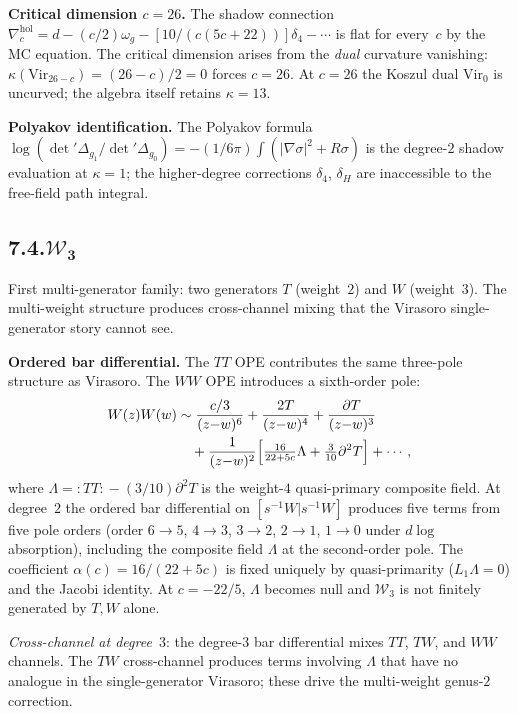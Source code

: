 \documentclass[11pt,reqno]{amsart}
\theoremstyle{definition}
\theoremstyle{remark}
\providecommand{\cW}{\mathcal{W}}
\providecommand{\Vir}{\mathrm{Vir}}
\providecommand{\hol}{\mathrm{hol}}
\numberwithin{equation}{section}
\begin{document}
\medskip\noindent\textbf{Critical dimension $c=26$.}\enspace
The shadow connection
$\nabla^{\hol}_c=d-(c/2)\omega_g
-[10/(c(5c+22))]\delta_4-\cdots$
is flat for every~$c$ by the MC equation. The critical dimension
arises from the \emph{dual} curvature vanishing:
$\kappa(\Vir_{26-c})=(26-c)/2=0$ forces $c=26$. At $c=26$ the
Koszul dual $\Vir_0$ is uncurved; the algebra itself retains
$\kappa=13$.

\medskip\noindent\textbf{Polyakov identification.}\enspace
The Polyakov formula
$\log(\det'\Delta_{g_1}/\det'\Delta_{g_0})
=-(1/6\pi)\int(|\nabla\sigma|^2+R\sigma)$
is the degree-$2$ shadow evaluation at $\kappa=1$; the
higher-degree corrections $\delta_4$, $\delta_H$ are
inaccessible to the free-field path integral.

\subsection*{7.4.\quad \texorpdfstring{$\boldsymbol{\cW_3}$}{W3}}

First multi-generator family: two generators $T$ (weight~$2$)
and $W$ (weight~$3$). The multi-weight structure produces
cross-channel mixing that the Virasoro single-generator story
cannot see.

\medskip\noindent\textbf{Ordered bar differential.}\enspace
The $TT$ OPE contributes the same three-pole structure as
Virasoro. The $WW$ OPE introduces a sixth-order pole:
\begin{align*}
W(z)W(w)
&\sim\frac{c/3}{(z{-}w)^6}+\frac{2T}{(z{-}w)^4}
+\frac{\partial T}{(z{-}w)^3}\\
&\quad+\frac{1}{(z{-}w)^2}\Bigl[\tfrac{16}{22+5c}\Lambda
+\tfrac{3}{10}\partial^2 T\Bigr]+\cdots,
\end{align*}
where $\Lambda=\!:TT:\!-(3/10)\partial^2 T$ is the weight-$4$
quasi-primary composite field. At degree~$2$ the ordered
bar differential on $[s^{-1}W|s^{-1}W]$ produces five
terms from five pole orders (order $6\to 5$, $4\to 3$,
$3\to 2$, $2\to 1$, $1\to 0$ under $d\log$ absorption),
including the composite field $\Lambda$ at the second-order
pole. The coefficient $\alpha(c)=16/(22+5c)$ is fixed
uniquely by quasi-primarity ($L_1\Lambda=0$) and the Jacobi
identity. At $c=-22/5$, $\Lambda$ becomes null and $\cW_3$
is not finitely generated by $T,W$ alone.

\emph{Cross-channel at degree~$3$}: the degree-$3$ bar
differential mixes $TT$, $TW$, and $WW$ channels. The
$TW$ cross-channel produces terms involving $\Lambda$ that
have no analogue in the single-generator Virasoro;
these drive the multi-weight genus-$2$ correction.
\end{document}

